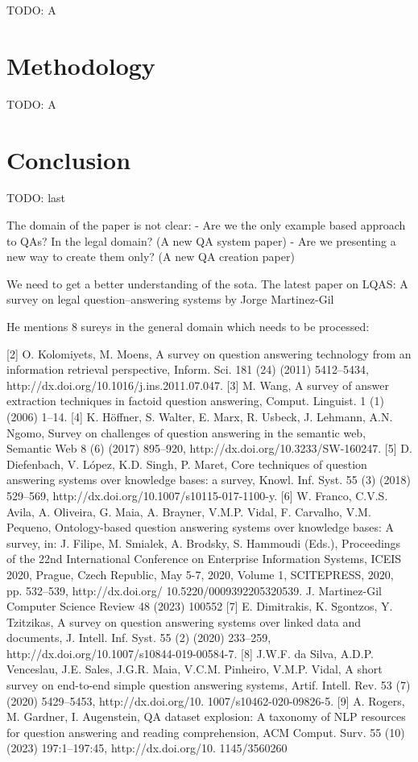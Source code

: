 \documentclass{IOS-Book-Article}
\begin{document}
TODO: A

\section{Methodology}

TODO: A

\section{Conclusion}

TODO: last

The domain of the paper is not clear:
- Are we the only example based approach to QAs? In the legal domain? (A new QA system paper)
- Are we presenting a new way to create them only? (A new QA creation paper)

We need to get a better understanding of the sota. The latest paper on LQAS: A survey on legal question–answering systems by Jorge Martinez-Gil

He mentions 8 sureys in the general domain which needs to be processed:

[2] O. Kolomiyets, M. Moens, A survey on question answering technology
from an information retrieval perspective, Inform. Sci. 181 (24) (2011)
5412–5434, http://dx.doi.org/10.1016/j.ins.2011.07.047.
[3] M. Wang, A survey of answer extraction techniques in factoid question
answering, Comput. Linguist. 1 (1) (2006) 1–14.
[4] K. Höffner, S. Walter, E. Marx, R. Usbeck, J. Lehmann, A.N. Ngomo, Survey
on challenges of question answering in the semantic web, Semantic Web
8 (6) (2017) 895–920, http://dx.doi.org/10.3233/SW-160247.
[5] D. Diefenbach, V. López, K.D. Singh, P. Maret, Core techniques of question
answering systems over knowledge bases: a survey, Knowl. Inf. Syst. 55
(3) (2018) 529–569, http://dx.doi.org/10.1007/s10115-017-1100-y.
[6] W. Franco, C.V.S. Avila, A. Oliveira, G. Maia, A. Brayner, V.M.P. Vidal,
F. Carvalho, V.M. Pequeno, Ontology-based question answering systems
over knowledge bases: A survey, in: J. Filipe, M. Smialek, A. Brodsky, S.
Hammoudi (Eds.), Proceedings of the 22nd International Conference on
Enterprise Information Systems, ICEIS 2020, Prague, Czech Republic, May
5-7, 2020, Volume 1, SCITEPRESS, 2020, pp. 532–539, http://dx.doi.org/
10.5220/0009392205320539.
J. Martinez-Gil Computer Science Review 48 (2023) 100552
[7] E. Dimitrakis, K. Sgontzos, Y. Tzitzikas, A survey on question answering
systems over linked data and documents, J. Intell. Inf. Syst. 55 (2) (2020)
233–259, http://dx.doi.org/10.1007/s10844-019-00584-7.
[8] J.W.F. da Silva, A.D.P. Venceslau, J.E. Sales, J.G.R. Maia, V.C.M. Pinheiro,
V.M.P. Vidal, A short survey on end-to-end simple question answering
systems, Artif. Intell. Rev. 53 (7) (2020) 5429–5453, http://dx.doi.org/10.
1007/s10462-020-09826-5.
[9] A. Rogers, M. Gardner, I. Augenstein, QA dataset explosion: A taxonomy
of NLP resources for question answering and reading comprehension,
ACM Comput. Surv. 55 (10) (2023) 197:1–197:45, http://dx.doi.org/10.
1145/3560260
\end{document}
